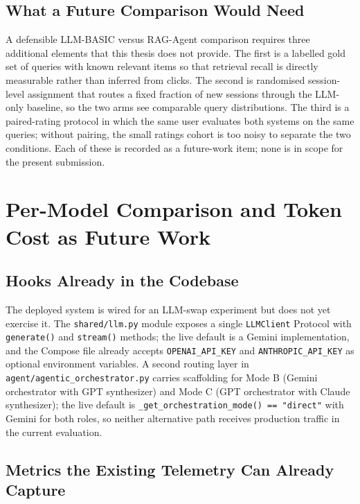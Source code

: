 \subsection{What a Future Comparison Would Need}

A defensible LLM-BASIC versus RAG-Agent comparison requires three additional elements that this thesis does not provide. The first is a labelled gold set of queries with known relevant items so that retrieval recall is directly measurable rather than inferred from clicks. The second is randomised session-level assignment that routes a fixed fraction of new sessions through the LLM-only baseline, so the two arms see comparable query distributions. The third is a paired-rating protocol in which the same user evaluates both systems on the same queries; without pairing, the small ratings cohort is too noisy to separate the two conditions. Each of these is recorded as a future-work item; none is in scope for the present submission.

\section{Per-Model Comparison and Token Cost as Future Work}
\label{sec:disc_per_model}

\subsection{Hooks Already in the Codebase}

The deployed system is wired for an LLM-swap experiment but does not yet exercise it. The \texttt{shared/llm.py} module exposes a single \texttt{LLMClient} Protocol with \texttt{generate()} and \texttt{stream()} methods; the live default is a Gemini implementation, and the Compose file already accepts \texttt{OPENAI\_API\_KEY} and \texttt{ANTHROPIC\_API\_KEY} as optional environment variables. A second routing layer in \texttt{agent/agentic\_orchestrator.py} carries scaffolding for Mode B (Gemini orchestrator with GPT synthesizer) and Mode C (GPT orchestrator with Claude synthesizer); the live default is \texttt{\_get\_orchestration\_mode()~==~"direct"} with Gemini for both roles, so neither alternative path receives production traffic in the current evaluation.

\subsection{Metrics the Existing Telemetry Can Already Capture}

